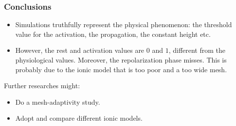 \documentclass[8pt]{beamer}
\begin{document}
\begin{frame}
\frametitle{Conclusions}
\begin{itemize}
	\item Simulations truthfully represent the physical phenomenon: the threshold value for the activation, the propagation, the constant height etc.
	\item However, the rest and activation values are $0$ and $1$, different from the physiological values. Moreover, the repolarization phase misses.
This is probably due to the ionic model that is too poor and a too wide mesh. 
\end{itemize}
\vspace{4mm}
Further researches might:
\begin{itemize}
	\item Do a mesh-adaptivity study.
	\item Adopt and compare different ionic models.
\end{itemize}
\end{frame}
\end{document}
